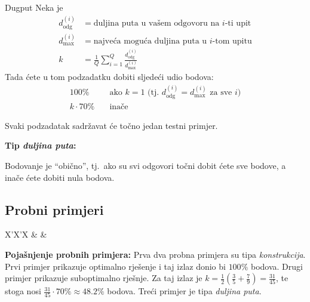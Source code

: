 \begin{statement}[
  problempoints=100,
  timelimit=5 sekundi,
  memorylimit=512 MiB,
]{Dugput}
Neka je
\begin{align*}
    d_\mathrm{odg}^{(i)} &= \text{duljina puta u vašem odgovoru na $i$-ti upit} \\ 
    d_\mathrm{max}^{(i)} &= \text{najveća moguća duljina puta u $i$-tom upitu} \\
    k &= \frac{1}{Q} \sum_{i=1}^Q \frac{d_\mathrm{odg}^{(i)}}{d_\mathrm{max}^{(i)}}
\end{align*}
Tada ćete u tom podzadatku dobiti sljedeći udio bodova:
\begin{align*}
    100\% &\quad \text{ako $k = 1$ (tj.\ $d_\mathrm{odg}^{(i)} = d_\mathrm{max}^{(i)}$ za sve $i$)} \\
    k \cdot 70\% &\quad \text{inače}
\end{align*}

Svaki podzadatak sadržavat će točno jedan testni primjer.

\textbf{Tip \textit{duljina puta}:}

Bodovanje je ``obično'', tj.\ ako su svi odgovori točni dobit ćete sve bodove,
a inače ćete dobiti nula bodova.

\subsection*{Probni primjeri}
\begin{tabularx}{\textwidth}{X'X'X}
 &
 &
\end{tabularx}

\textbf{Pojašnjenje probnih primjera:}
Prva dva probna primjera su tipa \textit{konstrukcija}.
Prvi primjer prikazuje optimalno rješenje i taj izlaz donio bi $100\%$ bodova.
Drugi primjer prikazuje suboptimalno rješnje. Za taj izlaz je $k = \frac{1}{2} (\frac{3}{5} + \frac{7}{9}) = \frac{31}{45}$, te stoga nosi $\frac{31}{45} \cdot 70\% \approx 48.2\%$ bodova.
Treći primjer je tipa \textit{duljina puta}.


\end{statement}

